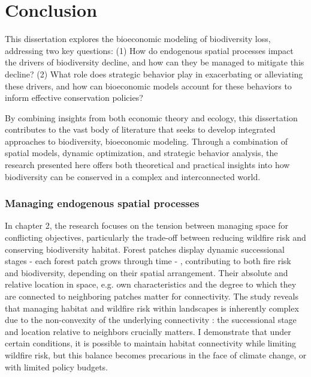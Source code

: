{}
\chapter*{Conclusion}
\onehalfspacing

This dissertation explores the bioeconomic modeling of biodiversity loss, addressing two key questions: (1) How do endogenous spatial processes impact the drivers of biodiversity decline, and how can they be managed to mitigate this decline? (2) What role does strategic behavior play in exacerbating or alleviating these drivers, and how can bioeconomic models account for these behaviors to inform effective conservation policies?

By combining insights from both economic theory and ecology, this dissertation contributes to the vast body of literature that seeks to develop integrated approaches to biodiversity, bioeconomic modeling. Through a combination of spatial models, dynamic optimization, and strategic behavior analysis, the research presented here offers both theoretical and practical insights into how biodiversity can be conserved in a complex and interconnected world.

{}
\subsection*{Managing endogenous spatial processes}

In chapter 2, the research focuses on the tension between managing space for conflicting objectives, particularly the trade-off between reducing wildfire risk and conserving biodiversity habitat. Forest patches display dynamic successional stages - each forest patch grows through time - , contributing to both fire risk and biodiversity, depending on their spatial arrangement. Their absolute and relative location in space, e.g. own characteristics and the degree to which they are connected to neighboring patches matter for connectivity. The study reveals that managing habitat and wildfire risk within landscapes is inherently complex due to the non-convexity of the underlying connectivity : the successional stage and location relative to neighbors crucially matters. I demonstrate that under certain conditions, it is possible to maintain habitat connectivity while limiting wildfire risk, but this balance becomes precarious in the face of climate change, or with limited policy budgets. 

